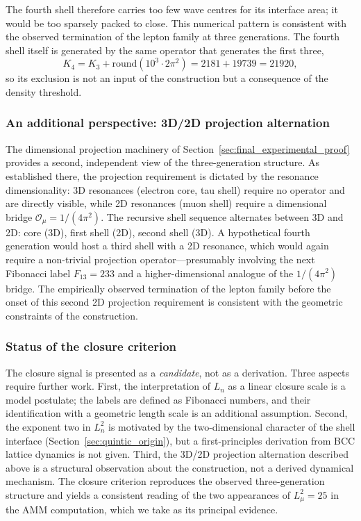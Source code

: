 \documentclass[10pt,a4paper]{article}
\begin{document}
The fourth shell therefore carries too few wave centres for its
interface area; it would be too sparsely packed to close. This
numerical pattern is consistent with the observed termination of the
lepton family at three generations. The fourth shell itself is
generated by the same operator that generates the first three,
\begin{equation}
	K_4 = K_3 + \mathrm{round}(10^3 \cdot 2\pi^2)
	= 2181 + 19739 = 21920 ,
\end{equation}
so its exclusion is not an input of the construction but a consequence
of the density threshold.

\subsubsection*{An additional perspective: 3D/2D projection alternation}
The dimensional projection machinery of
Section~\ref{sec:final_experimental_proof} provides a second, independent
view of the three-generation structure. As established there, the
projection requirement is dictated by the resonance dimensionality: 3D
resonances (electron core, tau shell) require no operator and are
directly visible, while 2D resonances (muon shell) require a
dimensional bridge $\mathcal{O}_\mu = 1/(4\pi^2)$. The recursive shell
sequence alternates between 3D and 2D: core (3D), first shell (2D),
second shell (3D). A hypothetical fourth generation would host a third
shell with a 2D resonance, which would again require a non-trivial
projection operator---presumably involving the next Fibonacci label
$F_{13}=233$ and a higher-dimensional analogue of the $1/(4\pi^2)$
bridge. The empirically observed termination of the lepton family
before the onset of this second 2D projection requirement is consistent
with the geometric constraints of the construction.

\subsubsection*{Status of the closure criterion}
The closure signal is presented as a \emph{candidate}, not as a
derivation. Three aspects require further work. First, the
interpretation of $L_n$ as a linear closure scale is a model postulate;
the labels are defined as Fibonacci numbers, and their identification
with a geometric length scale is an additional assumption. Second, the
exponent two in $L_n^2$ is motivated by the two-dimensional character
of the shell interface (Section~\ref{sec:quintic_origin}), but a
first-principles derivation from BCC lattice dynamics is not given.
Third, the 3D/2D projection alternation described above is a structural
observation about the construction, not a derived dynamical mechanism.
The closure criterion reproduces the observed three-generation
structure and yields a consistent reading of the two appearances of
$L_\mu^2 = 25$ in the AMM computation, which we take as its principal
evidence.
\end{document}
